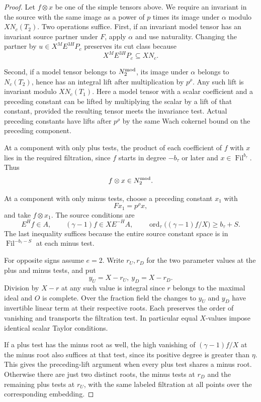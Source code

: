 \begin{proof}
Let \(f\otimes x\) be one of the simple tensors above. We require an
invariant in the source with the same image as a power of \(p\) times
its image under \(\alpha\) modulo \(XN_c(T_2)\). Two operations suffice.
First, if an invariant model tensor has an invariant source partner
under \(F\), apply \(\alpha\) and use naturality. Changing the partner by \(u\in X^M E^{3H}P_c\) preserves its cut class because
\[
 X^M E^{3H}P_c\subseteq XN_c.
\]

Second, if a model
tensor belongs to \(N^{\rm mod}_2\), its image under \(\alpha\) belongs to
\(N_c(T_2)\), hence has an integral lift after multiplication by
\(p^\rho\). Any such lift is invariant modulo \(XN_c(T_1)\).
Here a model tensor with a scalar coefficient and a preceding constant
can be lifted by multiplying the scalar by a lift of that constant,
provided the resulting tensor meets the invariance test. Actual
preceding constants have lifts after \(p^\rho\) by the same Wach
cokernel bound on the preceding component.

At a component with only plus tests, the product of each
coefficient of \(f\) with \(x\) lies in the required
filtration, since \(f\) starts in degree \(-b_\tau\) or
later and \(x\in\operatorname{Fil}^{b_\tau}\). Thus
\[
 f\otimes x\in N^{\rm mod}_2.
\]

At a component with only minus tests, choose a preceding constant
\(x_1\) with
\[
 F x_1=p^\rho x,
\]
and take \(f\otimes x_1\).
The source conditions are
\[
  E^H f\in A,\qquad
  (\gamma-1)f\in XE^{-H}A,\qquad
  \operatorname{ord}_{\tau}\big((\gamma-1)f/X\big)
      \ge b_\tau+S .
\]
The last inequality suffices because the entire source constant
space is in \(\operatorname{Fil}^{-b_\tau-S}\) at each minus test.

For opposite signs assume \(e=2\). Write \(r_U,r_D\) for the
two parameter values at the plus and minus tests, and put
\[
 y_U=X-r_U,\ y_D=X-r_D.
\]
Division by \(X-r\) at any such
value is integral since \(r\) belongs to the maximal ideal and
\(O\) is complete. Over the fraction field the changes to \(y_U\) and \(y_D\) have invertible linear term at their respective roots. Each preserves the order of vanishing and transports the filtration test. In particular equal \(X\)-values impose identical scalar Taylor conditions.

If a plus test has the minus
root as well, the high vanishing of \((\gamma-1)f/X\) at the
minus root also suffices at that test, since its positive degree
is greater than \(\eta\). This gives the preceding-lift argument
when every plus test shares a minus root. Otherwise there are just
two distinct roots, the minus tests at \(r_D\) and the remaining
plus tests at \(r_U\), with the same labeled filtration at all
points over the corresponding embedding.


\end{proof}
